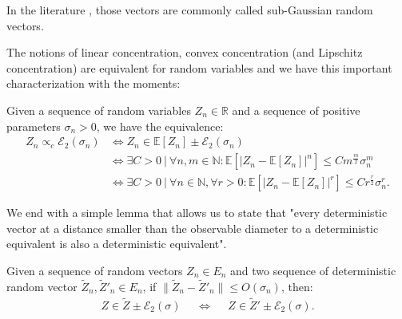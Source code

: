 \documentclass{ws-rmta}
\begin{document}
In the literature \cite{bou13}, those vectors are commonly called sub-Gaussian random vectors. 

The notions of linear concentration, convex concentration (and Lipschitz concentration) are equivalent for random variables and we have this important characterization with the moments:
\begin{proposition}\label{pro:concentration_variable_caracterisation_moment}
  Given a sequence of random variables $Z_n \in \mathbb R$ and a sequence of positive parameters $\sigma_n>0$, we have the equivalence:
  \begin{align*}
    Z_n \propto_c \mathcal E_2(\sigma_n)
    &\Longleftrightarrow
    Z_n \in \mathbb E[Z_n] \pm \mathcal E_2(\sigma_n)\\
    &\Longleftrightarrow \exists C >0 \ | \ \forall n,m \in \mathbb N:
    \mathbb E \left[ \left\vert Z_n - \mathbb E[Z_n] \right\vert^n \right] \leq C m^{\frac{m}{2}}\sigma_n^m \\
    &\Longleftrightarrow \exists C >0 \ | \ \forall n \in \mathbb N, \forall r>0: \mathbb E \left[ \left\vert Z_n - \mathbb E[Z_n] \right\vert^r \right] \leq Cr^{\frac{r}{2}}\sigma_n^r .
  \end{align*}
\end{proposition}

We end with a simple lemma that allows us to state that "every deterministic vector at a distance smaller than the observable diameter to a deterministic equivalent is also a deterministic equivalent".
\begin{lemma}\label{lem:trou_noir_diametre_observable}
  Given a sequence of random vectors $Z_n \in E_n$ and two sequence of deterministic random vector $\tilde Z_n, \tilde Z'_n \in E_n$, if $\|\tilde Z_n - \tilde Z'_n \| \leq O(\sigma_n)$, then:
  \begin{align*}
    Z \in \tilde Z \pm \mathcal E_2(\sigma)&
    &\Longleftrightarrow&
    &Z \in \tilde Z' \pm \mathcal E_2(\sigma).
  \end{align*}
\end{lemma}
\end{document}
